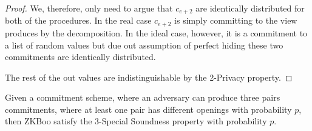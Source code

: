 \begin{proof}
  We, therefore, only need to argue that $c_{e+2}$ are identically distributed
  for both of the procedures. In the real case $c_{e+2}$ is simply committing to
  the view produces by the decomposition. In the ideal case, however, it is a
  commitment to a list of random values but due out assumption of perfect hiding
  these two commitments are identically distributed.

  The rest of the out values are indistinguishable by the 2-Privacy property.

\end{proof}

\begin{lemma}
  Given a commitment scheme, where an adversary can produce three pairs
  commitments, where at least one pair has different openings with probability
  $p$, then ZKBoo satisfy the 3-Special Soundness property with probability $p$.
\end{lemma}
